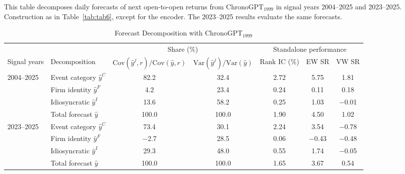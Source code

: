 \begin{table}[htbp]
\centering
\caption{Forecast Decomposition with ChronoGPT$_{1999}$}
\label{tab:tabB_split}
\begin{minipage}{\linewidth}\footnotesize
This table decomposes daily forecasts of next open-to-open returns from ChronoGPT$_{1999}$ in signal years 2004--2025 and 2023--2025. Construction as in Table~\ref{tab:tab6}, except for the encoder. The 2023--2025 results evaluate the same forecasts.
\end{minipage}
\medskip

{\footnotesize
\begin{adjustbox}{max width=\linewidth, max totalheight=0.75\textheight}
\begin{tabular}{llccccc}
\toprule
\multicolumn{2}{c}{} & \multicolumn{2}{c}{Share (\%)} & \multicolumn{3}{c}{Standalone performance} \\
\cmidrule(lr){3-4} \cmidrule(lr){5-7}
Signal years & Decomposition & $\mathrm{Cov}(\hat y^j,r)/\mathrm{Cov}(\hat y,r)$ & $\mathrm{Var}(\hat y^j)/\mathrm{Var}(\hat y)$ & Rank IC (\%) & EW SR & VW SR \\
\midrule
2004--2025 & Event category $\hat y^C$ & \phantom{$-$0}82.2 & \phantom{0}32.4 & 2.72 & \phantom{$-$}5.75 & \phantom{$-$}1.81 \\
 & Firm identity $\hat y^F$ & \phantom{$-$00}4.2 & \phantom{0}23.4 & 0.24 & \phantom{$-$}0.11 & \phantom{$-$}0.18 \\
 & Idiosyncratic $\hat y^I$ & \phantom{$-$0}13.6 & \phantom{0}58.2 & 0.25 & \phantom{$-$}1.03 & $-$0.01 \\
 & Total forecast $\hat y$ & \phantom{$-$}100.0 & 100.0 & 1.90 & \phantom{$-$}4.50 & \phantom{$-$}1.02 \\
\midrule
2023--2025 & Event category $\hat y^C$ & \phantom{$-$0}73.4 & \phantom{0}30.1 & 2.24 & \phantom{$-$}3.54 & $-$0.78 \\
 & Firm identity $\hat y^F$ & \phantom{00}$-$2.7 & \phantom{0}28.5 & 0.06 & $-$0.43 & $-$0.48 \\
 & Idiosyncratic $\hat y^I$ & \phantom{$-$0}29.3 & \phantom{0}48.0 & 0.55 & \phantom{$-$}1.74 & $-$0.05 \\
 & Total forecast $\hat y$ & \phantom{$-$}100.0 & 100.0 & 1.65 & \phantom{$-$}3.67 & \phantom{$-$}0.54 \\
\bottomrule
\end{tabular}
\end{adjustbox}
}
\end{table}
